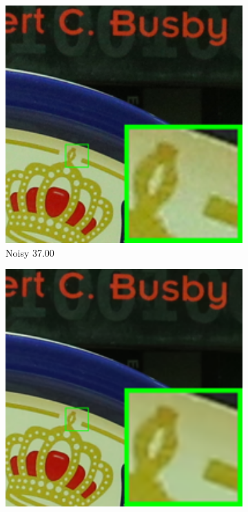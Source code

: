 \begin{figure}
    \centering
    \begin{subfigure}[t]{0.19\textwidth}
        \centering
        \includegraphics[width=1\textwidth]{images/mcwnnm/cc/resize_br_Noisy_5dmark3_iso3200_1.png}
		\caption{Noisy 37.00}
    \end{subfigure}
    \hfill
    \begin{subfigure}[t]{0.19\textwidth}
        \centering
        \includegraphics[width=1\textwidth]{images/mcwnnm/cc/resize_br_CBM3D_CC15_5dmark3_iso3200_1.png}

\end{subfigure}
\end{figure}
